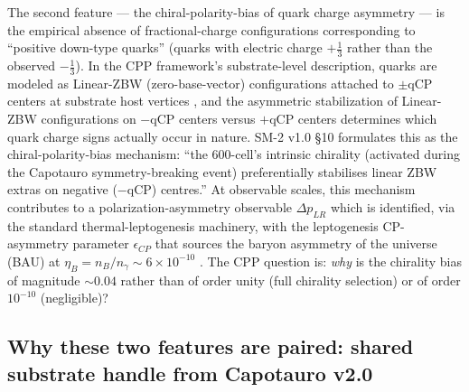 \documentclass[11pt,letterpaper]{article}
\newcommand{\DeltapLR}{\Delta p_{LR}}
\begin{document}
The second feature --- the chiral-polarity-bias of quark charge asymmetry --- is the empirical absence of fractional-charge configurations corresponding to ``positive down-type quarks'' (quarks with electric charge $+\frac{1}{3}$ rather than the observed $-\frac{1}{3}$). In the CPP framework's substrate-level description, quarks are modeled as Linear-ZBW (zero-base-vector) configurations attached to $\pm$qCP centers at substrate host vertices \cite{SM2v1}, and the asymmetric stabilization of Linear-ZBW configurations on $-$qCP centers versus $+$qCP centers determines which quark charge signs actually occur in nature. SM-2 v1.0 §10 \cite{SM2v1} formulates this as the chiral-polarity-bias mechanism: ``the 600-cell's intrinsic chirality (activated during the Capotauro symmetry-breaking event) preferentially stabilises linear ZBW extras on negative ($-$qCP) centres.'' At observable scales, this mechanism contributes to a polarization-asymmetry observable $\DeltapLR$ which is identified, via the standard thermal-leptogenesis machinery, with the leptogenesis CP-asymmetry parameter $\epsilon_{CP}$ that sources the baryon asymmetry of the universe (BAU) at $\eta_B = n_B/n_\gamma \sim 6 \times 10^{-10}$ \cite{DavidsonNardiNir}. The CPP question is: \emph{why} is the chirality bias of magnitude $\sim 0.04$ rather than of order unity (full chirality selection) or of order $10^{-10}$ (negligible)?

\subsection{Why these two features are paired: shared substrate handle from Capotauro v2.0}
\label{sec:why_paired}
\end{document}
